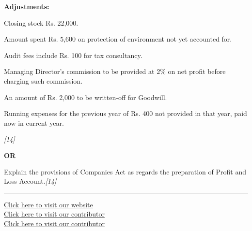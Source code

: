 \documentclass[11pt,a4paper]{article}
\newcommand{\pts}[1]{\hfill   \textit{[#1]}}
\begin{document}
\noindent   \textbf{Adjustments:}

\begin{parts}
  \item Closing stock Rs. 22,000.
  \item Amount spent Rs. 5,600 on protection of environment not yet accounted for.
  \item Audit fees include Rs. 100 for tax consultancy.
  \item Managing Director's commission to be provided at 2\% on net profit before charging such commission.
  \item An amount of Rs. 2,000 to be written-off for Goodwill.
  \item Running expenses for the previous year of Rs. 400 not provided in that year, paid now in current year.
\end{parts}
\pts{14}

\centerline{   \textbf{OR}}

Explain the provisions of Companies Act as regards the preparation of Profit and Loss Account.\pts{14}

\vfill
\rule{\linewidth}{0.4pt}

\begin{center}\small
\href{https://bhu-exam.vercel.app/}{Click here to visit our website}\\[4pt]
\href{https://me-aryan.vercel.app/}{Click here to visit our contributor}\\[4pt]
\href{https://quashan-me.vercel.app/}{Click here to visit our contributor}
\end{center}
\end{document}
